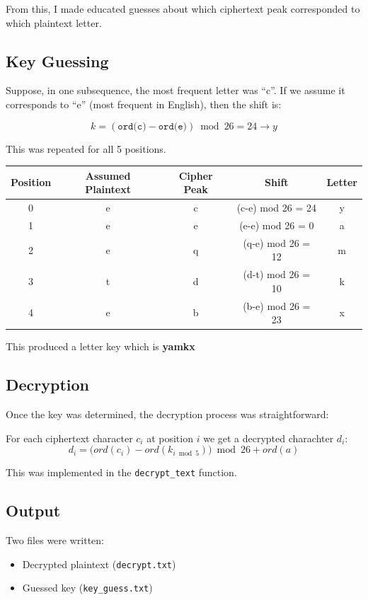 \documentclass[12pt]{article}
\begin{document}
From this, I made educated guesses about which ciphertext peak corresponded to which plaintext letter.

\subsection{Key Guessing}
Suppose, in one subsequence, the most frequent letter was ``c''. If we assume it corresponds to ``e'' (most frequent in English), then the shift is:

\[
k = (\texttt{ord(c)} - \texttt{ord(e)}) \bmod 26 = 24 \rightarrow y
\]

This was repeated for all 5 positions.  

\begin{center}
\begin{tabular}{|c|c|c|c|c|}
\hline
Position & Assumed Plaintext & Cipher Peak & Shift & Letter \\
\hline
0 & e & c & (c-e) mod 26 = 24 & y\\
1 & e & e & (e-e) mod 26 = 0 & a\\
2 & e & q & (q-e) mod 26 = 12 & m\\
3 & t & d & (d-t) mod 26 = 10 & k\\
4 & e & b & (b-e) mod 26 = 23 & x\\
\hline
\end{tabular}
\end{center}

This produced a letter key which is \textbf{yamkx}

\subsection{Decryption}
Once the key was determined, the decryption process was straightforward:

For each ciphertext character $c_i$ at position $i$ we get a decrypted charachter $d_i$:
\[
d_i = \Big( ord(c_i) - ord(k_{i \bmod 5})  \Big) \bmod 26 + ord(a)
\]

This was implemented in the \texttt{decrypt\_text} function.

\subsection{Output}
Two files were written:
\begin{itemize}
    \item Decrypted plaintext (\texttt{decrypt.txt})
    \item Guessed key (\texttt{key\_guess.txt})
\end{itemize}
\end{document}
